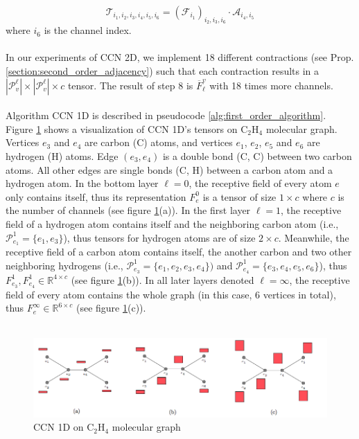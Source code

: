\documentclass[sigchi]{acmart}
\theoremstyle{definition}
\theoremstyle{theorem}
\theoremstyle{corollary}
\theoremstyle{lemma}
\theoremstyle{remark}
\theoremstyle{prop}
\begin{document}
\begin{equation}
\mathcal{T}_{i_1, i_2, i_3, i_4, i_5, i_6} = (\mathcal{F}_{i_1})_{i_2, i_3, i_6} \cdot \mathcal{A}_{i_4, i_5}
\end{equation}
where $i_6$ is the channel index. \\ \\
In our experiments of CCN 2D, we implement 18 different contractions (see Prop. \ref{section:second_order_adjacency}) such that each contraction results in a $|\mathcal{P}_v^\ell| \times |\mathcal{P}_v^\ell| \times c$ tensor. The result of step 8 is $\overline{F}_\ell^v$ with 18 times more channels. \\ \\
Algorithm CCN 1D is described in pseudocode \ref{alg:first_order_algorithm}. Figure \ref{fig:first_order} shows a visualization of CCN 1D's tensors on C$_2$H$_4$ molecular graph. Vertices $e_3$ and $e_4$ are carbon (C) atoms, and vertices $e_1$, $e_2$, $e_5$ and $e_6$ are hydrogen (H) atoms. Edge $(e_3, e_4)$ is a double bond (C, C) between two carbon atoms. All other edges are single bonds (C, H) between a carbon atom and a hydrogen atom. In the bottom layer $\ell = 0$, the receptive field of every atom $e$ only contains itself, thus its representation $F_e^0$ is a tensor of size $1 \times c$ where $c$ is the number of channels (see figure \ref{fig:first_order}(a)). In the first layer $\ell = 1$, the receptive field of a hydrogen atom contains itself and the neighboring carbon atom (i.e., $\mathcal{P}_{e_1}^1 = \{e_1, e_3\}$), thus tensors for hydrogen atoms are of size $2 \times c$. Meanwhile, the receptive field of a carbon atom contains itself, the another carbon and two other neighboring hydrogens (i.e., $\mathcal{P}_{e_3}^1 = \{e_1, e_2, e_3, e_4\})$ and $\mathcal{P}_{e_4}^1 = \{e_3, e_4, e_5, e_6\}$), thus $F_{e_3}^1, F_{e_4}^1 \in \mathbb{R}^{4 \times c}$ (see figure \ref{fig:first_order}(b)). In all later layers denoted $\ell = \infty$, the receptive field of every atom contains the whole graph (in this case, 6 vertices in total), thus $F_e^\infty \in \mathbb{R}^{6 \times c}$ (see figure \ref{fig:first_order}(c)). \\ \\
\begin{figure}
\caption{\label{fig:first_order} CCN 1D on C$_2$H$_4$ molecular graph}
\centering
\includegraphics[scale=0.3]{first_order}
\end{figure}
\end{document}
